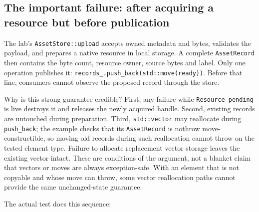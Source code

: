 \subsection{The important failure: after acquiring a resource but before publication}\label{01-foundations-i-ch004-the-important-failure-after-acquiring-a-resource-but-before-publication}

The lab's \texttt{AssetStore::upload} accepts owned metadata and bytes, validates the payload, and prepares a native resource in local storage. A complete \texttt{AssetRecord} then contains the byte count, resource owner, source bytes and label. Only one operation publishes it: \texttt{records\_.push\_back(std::move(ready))}. Before that line, consumers cannot observe the proposed record through the store.

Why is this strong guarantee credible? First, any failure while \texttt{Resource\ pending} is live destroys it and releases the newly acquired handle. Second, existing records are untouched during preparation. Third, \texttt{std::vector} may reallocate during \texttt{push\_back}; the example checks that its \texttt{AssetRecord} is nothrow move-constructible, so moving old records during such reallocation cannot throw on the tested element type. Failure to allocate replacement vector storage leaves the existing vector intact. These are conditions of the argument, not a blanket claim that vectors or moves are always exception-safe. With an element that is not copyable and whose move can throw, some vector reallocation paths cannot provide the same unchanged-state guarantee.

The actual test does this sequence:

